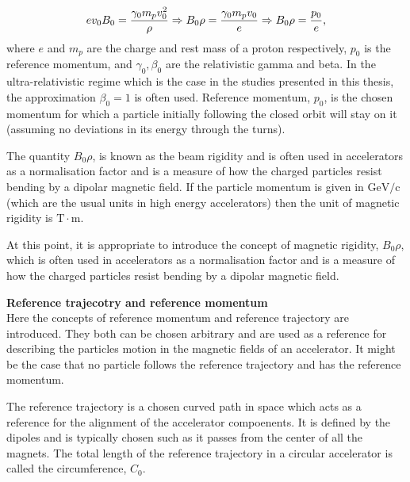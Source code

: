 \begin{equation}\label{eq:Brho}
    e v_0 B_0 = \frac{{\gamma_0} m_p v_0^2}{\rho} \Rightarrow B_0 \rho = \frac{\gamma_0 m_p v_0}{e} \Rightarrow B_0 \rho = \frac{p_0}{e},
\end{equation}
where $e$ and $m_p$ are the charge and rest mass of a proton respectively, $p_0$ is the reference momentum, and $\gamma_0, \beta_0$ are the relativistic gamma and beta. In the ultra-relativistic regime which is the case in the studies presented in this thesis, the approximation $\beta_0=1$ is often used.  Reference momentum, $p_0$, is the chosen momentum for which a particle initially following the closed orbit will stay on it (assuming no deviations in its energy through the turns).

The quantity $B_0 \rho$, is known as the beam rigidity and is often used in accelerators as a normalisation factor and is a measure of how the charged particles resist bending by a dipolar magnetic field. If the particle momentum is given in $\mathrm{GeV /c}$ (which are the usual units in high energy accelerators) then the unit of magnetic rigidity is $\mathrm{T \cdot m}$.






At this point, it is appropriate to introduce the concept of magnetic rigidity, $B_0 \rho$, which is often used in accelerators as a normalisation factor and is a measure of how the charged particles resist bending by a dipolar magnetic field.




\textbf{Reference trajecotry and reference momentum}\\
Here the concepts of reference momentum and reference trajectory are introduced. They both can be chosen arbitrary and are used as a reference for describing the particles motion in the magnetic fields of an accelerator. It might be the case that no particle follows the reference trajectory and has the reference momentum.

The reference trajectory is a chosen curved path in space which acts as a reference for the alignment of the accelerator compoenents. It is defined by the dipoles and is typically chosen such as it passes from the center of all the magnets. %
The total length of the reference trajectory in a circular accelerator is called the circumference, $C_0$.


